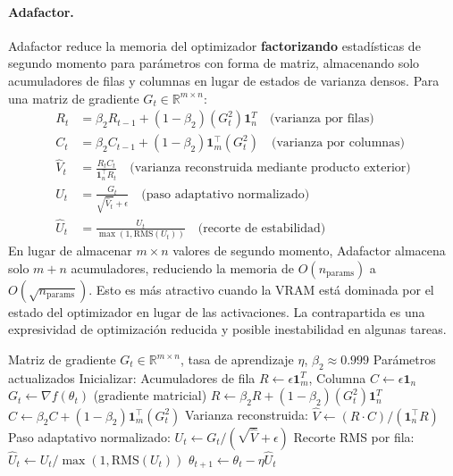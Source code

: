 \paragraph{Adafactor.}
Adafactor reduce la memoria del optimizador \textbf{factorizando} estadísticas de segundo momento para parámetros con forma de matriz, almacenando solo acumuladores de filas y columnas en lugar de estados de varianza densos. Para una matriz de gradiente $G_t \in \mathbb{R}^{m \times n}$:
\begin{align}
R_t &= \beta_2 R_{t-1} + (1-\beta_2)(G_t^2) \mathbf{1}_n^T \quad\text{(varianza por filas)} \\
C_t &= \beta_2 C_{t-1} + (1-\beta_2) \mathbf{1}_m^\top (G_t^2) \quad\text{(varianza por columnas)} \\
\hat{V}_t &= \frac{R_t C_t}{\mathbf{1}_n^\top R_t} \quad\text{(varianza reconstruida mediante producto exterior)} \\
U_t &= \frac{G_t}{\sqrt{\hat{V}_t}+\epsilon} \quad\text{(paso adaptativo normalizado)} \\
\hat{U}_t &= \frac{U_t}{\max(1, \text{RMS}(U_t))} \quad\text{(recorte de estabilidad)}
\end{align}
En lugar de almacenar $m \times n$ valores de segundo momento, Adafactor almacena solo $m + n$ acumuladores, reduciendo la memoria de $O(n_{\text{params}})$ a $O(\sqrt{n_{\text{params}}})$. Esto es más atractivo cuando la VRAM está dominada por el estado del optimizador en lugar de las activaciones. La contrapartida es una expresividad de optimización reducida y posible inestabilidad en algunas tareas.

\begin{algorithm}[H]
\caption{Adafactor (Estadísticas de Segundo Momento Factorizadas)}
\label{alg:adafactor}
\begin{algorithmic}[1]
\Require Matriz de gradiente $G_t \in \mathbb{R}^{m \times n}$, tasa de aprendizaje $\eta$, $\beta_2 \approx 0.999$
\Ensure Parámetros actualizados
\State Inicializar: Acumuladores de fila $R \gets \epsilon \mathbf{1}^T_m$, Columna $C \gets \epsilon \mathbf{1}_n$
    \State $G_t \gets \nabla f(\theta_t)$ (gradiente matricial)
    \State $R \gets \beta_2 R + (1-\beta_2) (G_t^2) \mathbf{1}_n^T$ 
    \State $C \gets \beta_2 C + (1-\beta_2) \mathbf{1}_m^\top (G_t^2)$ 
    \State Varianza reconstruida: $\hat{V} \gets (R \cdot C) / (\mathbf{1}_n^\top R)$ 
    \State Paso adaptativo normalizado: $U_t \gets G_t / (\sqrt{\hat{V}} + \epsilon)$
    \State Recorte RMS por fila: $\hat{U}_t \gets U_t / \max(1, \text{RMS}(U_t))$
    \State $\theta_{t+1} \gets \theta_t - \eta \hat{U}_t$
\EndFor
\end{algorithmic}
\end{algorithm}

